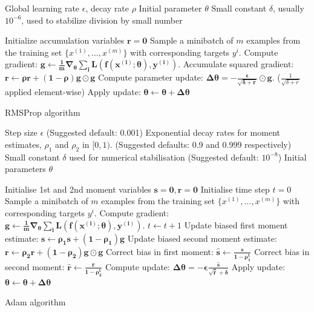 \begin{algorithm}[ht]
\begin{algorithmic}
    Global learning rate $\epsilon$, decay rate $\rho$
    Initial parameter $\theta$
    Small constant $\delta$, usually $10^{-6}$, used to stabilize division by small number
   
   \STATE Initialize accumulation variables $\boldsymbol{r=0}$
   \STATE Sample a minibatch of $m$ examples from the training set $\{x^{(1)},...,x^{(m)}\}$ with corresponding targets $y^{i}$.
   \STATE Compute gradient: $\boldsymbol{g \leftarrow \frac{1}{m}\nabla_\theta \sum_i L(f(x^{(i)}; \theta), y^{(i)}).}$
   \STATE Accumulate squared gradient: \\ $\boldsymbol{r \leftarrow \rho r + (1 - \rho) g \odot g}$
   \STATE Compute parameter update: $\boldsymbol{\Delta\theta = -\frac{\epsilon}{\sqrt{\delta+r}} \odot g.}$ ($\frac{1}{\sqrt{\delta+r}}$ applied element-wise)
   \STATE Apply update: $\boldsymbol{\theta \leftarrow \theta + \Delta \theta}$
   \ENDWHILE
\end{algorithmic}
  \caption{RMSProp algorithm}
  \label{alg:RMSProp}
\end{algorithm}


\begin{algorithm}[ht]
\begin{algorithmic}
    Step size $\epsilon$ (Suggested default: 0.001)
    Exponential decay rates for moment estimates, $\rho_1$ and $\rho_2$ in $[0,1)$. (Suggested defaults: 0.9 and 0.999 respectively)
    Small constant $\delta$ used for numerical stabilisation (Suggested default: $10^{-8}$)
    Initial parameters $\theta$
   
   \STATE Initialise 1st and 2nd moment variables $\mathbf{s=0, r=0}$
   \STATE Initialise time step $t=0$
   \STATE Sample a minibatch of $m$ examples from the training set $\{x^{(1)},...,x^{(m)}\}$ with corresponding targets $y^{i}$.
   \STATE Compute gradient: $\boldsymbol{g \leftarrow \frac{1}{m}\nabla_\theta \sum_i L(f(x^{(i)}; \theta), y^{(i)}).}$
   \STATE $t \leftarrow t + 1$
   \STATE Update biased first moment estimate: $\boldsymbol{s \leftarrow \rho_1 s + (1-\rho_1) g}$
   \STATE Update biased second moment estimate: $\boldsymbol{r \leftarrow \rho_2 r + (1-\rho_2) g \odot g}$
   \STATE Correct bias in first moment: $\boldsymbol{\hat{s} \leftarrow \frac{s}{1-\rho_1^t}}$
   \STATE Correct bias in second moment: $\boldsymbol{\hat{r} \leftarrow \frac{r}{1-\rho_2^t}}$
   \STATE Compute update: $\boldsymbol{\Delta \theta = -\epsilon \frac{\hat{s}}{\sqrt{\hat{r}} + \delta}}$
   \STATE Apply update: $\boldsymbol{\theta \leftarrow \theta + \Delta \theta}$
   \ENDWHILE
\end{algorithmic}
  \caption{Adam algorithm}
  \label{alg:Adam}
\end{algorithm}

